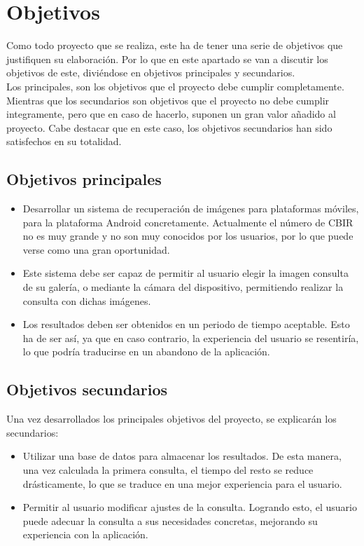 \chapter{Objetivos}
\label{cap:objetivos}

Como todo proyecto que se realiza, este ha de tener una serie de objetivos que justifiquen su elaboración. Por lo que en este apartado se van a discutir los objetivos de este, diviéndose en objetivos principales y secundarios.\\

Los principales, son los objetivos que el proyecto debe cumplir completamente. Mientras que los secundarios son objetivos que el proyecto no debe cumplir integramente, pero que en caso de hacerlo, suponen un gran valor añadido al proyecto. Cabe destacar que en este caso, los objetivos secundarios han sido satisfechos en su totalidad.\\

\section{Objetivos principales}

\begin{itemize}
  \item Desarrollar un sistema de recuperación de imágenes para plataformas móviles, para la plataforma Android concretamente. Actualmente el número de CBIR no es muy grande y no son muy conocidos por los usuarios, por lo que puede verse como una gran oportunidad.
  
  \item Este sistema debe ser capaz de permitir al usuario elegir la imagen consulta de su galería, o mediante la cámara del dispositivo, permitiendo realizar la consulta con dichas imágenes.
  
  \item Los resultados deben ser obtenidos en un periodo de tiempo aceptable. Esto ha de ser así, ya que en caso contrario, la experiencia del usuario se resentiría, lo que podría traducirse en un abandono de la aplicación.  
\end{itemize}


\section{Objetivos secundarios}

Una vez desarrollados los principales objetivos del proyecto, se explicarán los secundarios:

\begin{itemize}
  \item Utilizar una base de datos para almacenar los resultados. De esta manera, una vez calculada la primera consulta, el tiempo del resto se reduce drásticamente, lo que se traduce en una mejor experiencia para el usuario.

  \item Permitir al usuario modificar ajustes de la consulta. Logrando esto, el usuario puede adecuar la consulta a sus necesidades concretas, mejorando su experiencia con la aplicación.
\end{itemize}
